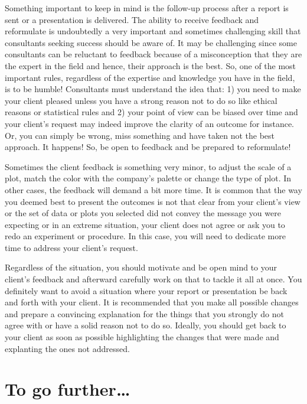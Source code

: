 \documentclass[
]{book}
\begin{document}
Something important to keep in mind is the follow-up process after a report is sent or a presentation is delivered. The ability to receive feedback and reformulate is undoubtedly a very important and sometimes challenging skill that consultants seeking success should be aware of. It may be challenging since some consultants can be reluctant to feedback because of a misconception that they are the expert in the field and hence, their approach is the best. So, one of the most important rules, regardless of the expertise and knowledge you have in the field, is to be humble! Consultants must understand the idea that: 1) you need to make your client pleased unless you have a strong reason not to do so like ethical reasons or statistical rules and 2) your point of view can be biased over time and your client's request may indeed improve the clarity of an outcome for instance. Or, you can simply be wrong, miss something and have taken not the best approach. It happens! So, be open to feedback and be prepared to reformulate!

Sometimes the client feedback is something very minor, to adjust the scale of a plot, match the color with the company's palette or change the type of plot. In other cases, the feedback will demand a bit more time. It is common that the way you deemed best to present the outcomes is not that clear from your client's view or the set of data or plots you selected did not convey the message you were expecting or in an extreme situation, your client does not agree or ask you to redo an experiment or procedure. In this case, you will need to dedicate more time to address your client's request.

Regardless of the situation, you should motivate and be open mind to your client's feedback and afterward carefully work on that to tackle it all at once. You definitely want to avoid a situation where your report or presentation be back and forth with your client. It is recommended that you make all possible changes and prepare a convincing explanation for the things that you strongly do not agree with or have a solid reason not to do so. Ideally, you should get back to your client as soon as possible highlighting the changes that were made and explanting the ones not addressed.

\hypertarget{to-go-further-1}{%
\section{To go further\ldots{}}\label{to-go-further-1}}
\end{document}
